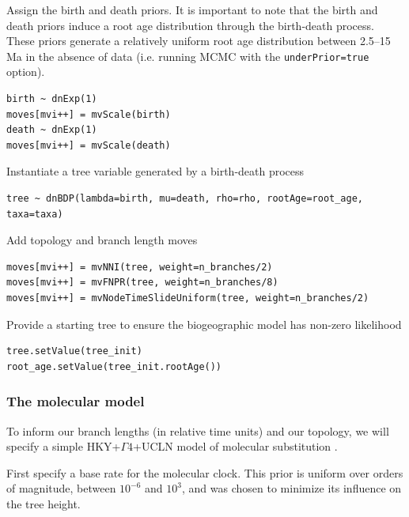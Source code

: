 Assign the birth and death priors.
It is important to note that the birth and death priors induce a root age distribution through the birth-death process.
These priors generate a relatively uniform root age distribution between 2.5--15 Ma in the absence of data (i.e. running MCMC with the {\tt underPrior=true} option).
\begin{snugshade}
\begin{lstlisting}
birth ~ dnExp(1)
moves[mvi++] = mvScale(birth)
death ~ dnExp(1)
moves[mvi++] = mvScale(death)
\end{lstlisting}
\end{snugshade}

Instantiate a tree variable generated by a birth-death process
\begin{snugshade}
\begin{lstlisting}
tree ~ dnBDP(lambda=birth, mu=death, rho=rho, rootAge=root_age, taxa=taxa)
\end{lstlisting}
\end{snugshade}


Add topology and branch length moves
\begin{snugshade}
\begin{lstlisting}
moves[mvi++] = mvNNI(tree, weight=n_branches/2)
moves[mvi++] = mvFNPR(tree, weight=n_branches/8)
moves[mvi++] = mvNodeTimeSlideUniform(tree, weight=n_branches/2)
\end{lstlisting}
\end{snugshade}

Provide a starting tree to ensure the biogeographic model has non-zero likelihood

\begin{snugshade}
\begin{lstlisting}
tree.setValue(tree_init)
root_age.setValue(tree_init.rootAge())
\end{lstlisting}
\end{snugshade}


\subsubsection{The molecular model}

To inform our branch lengths (in relative time units) and our topology, we will specify a simple HKY+$\Gamma4$+UCLN model of molecular substitution \citep{Hasegawa1985,Yang1998,Drummond2006}.

First specify a base rate for the molecular clock.
This prior is uniform over orders of magnitude, between $10^{-6}$ and $10^3$, and was chosen to minimize its influence on the tree height.


